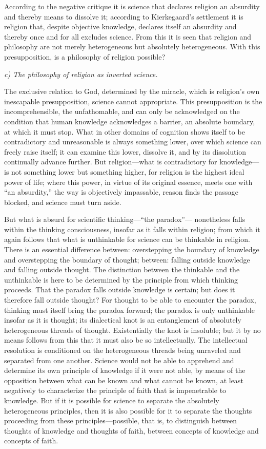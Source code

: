 \documentclass[12pt,a4paper]{article}
\begin{document}
According to the negative critique it is science that declares
religion an absurdity and thereby means to dissolve it;
according to Kierkegaard's settlement it is religion that,
despite objective knowledge, declares itself an absurdity and
thereby once and for all excludes science. From this it is seen
that religion and philosophy are not merely heterogeneous but
absolutely heterogeneous. With this presupposition, is a
philosophy of religion possible?

\medskip
\noindent\textit{c) The philosophy of religion as inverted science.}
\medskip

The exclusive relation to God, determined by the miracle, which
is religion's own inescapable presupposition, science cannot
appropriate. This presupposition is the incomprehensible, the
unfathomable, and can only be acknowledged on the condition that
human knowledge acknowledges a barrier, an absolute boundary, at
which it must stop. What in other domains of cognition shows
itself to be contradictory and unreasonable is always something
lower, over which science can freely raise itself; it can
examine this lower, dissolve it, and by its dissolution
continually advance further. But religion---what is
contradictory for knowledge---is not something lower but
something higher, for religion is the highest ideal power of
life; where this power, in virtue of its original essence,
meets one with ``an absurdity,'' the way is objectively
impassable, reason finds the passage blocked, and science must
turn aside.

But what is absurd for scientific thinking---``the paradox''---
nonetheless falls within the thinking consciousness, insofar as
it falls within religion; from which it again follows that what
is unthinkable for science can be thinkable in religion. There
is an essential difference between: overstepping the boundary of
knowledge and overstepping the boundary of thought; between:
falling outside knowledge and falling outside thought. The
distinction between the thinkable and the unthinkable is here to
be determined by the principle from which thinking proceeds.
That the paradox falls outside knowledge is certain; but does it
therefore fall outside thought? For thought to be able to
encounter the paradox, thinking must itself bring the paradox
forward; the paradox is only unthinkable insofar as it is
thought; its dialectical knot is an entanglement of absolutely
heterogeneous threads of thought. Existentially the knot is
insoluble; but it by no means follows from this that it must
also be so intellectually. The intellectual resolution is
conditioned on the heterogeneous threads being unraveled and
separated from one another. Science would not be able to
apprehend and determine its own principle of knowledge if it
were not able, by means of the opposition between what can be
known and what cannot be known, at least negatively to
characterize the principle of faith that is impenetrable to
knowledge. But if it is possible for science to separate the
absolutely heterogeneous principles, then it is also possible
for it to separate the thoughts proceeding from these
principles---possible, that is, to distinguish between thoughts
of knowledge and thoughts of faith, between concepts of
knowledge and concepts of faith.
\end{document}
